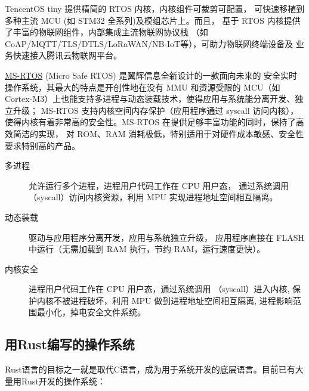 \documentclass{../runikraft-report}
\begin{document}
TencentOS tiny 提供精简的 RTOS 内核，内核组件可裁剪可配置，
可快速移植到多种主流 MCU (如 STM32 全系列)及模组芯片上。而且，
基于 RTOS 内核提供了丰富的物联网组件，内部集成主流物联网协议栈
（如CoAP/MQTT/TLS/DTLS/LoRaWAN/NB-IoT等），可助力物联网终端设备及
业务快速接入腾讯云物联网平台。

\href{https://github.com/ms-rtos}{MS-RTOS} (Micro Safe RTOS) 是翼辉信息全新设计的一款面向未来的
安全实时操作系统，其最大的特点是开创性地在没有 MMU 和资源受限的 MCU（如Cortex-M3）上也能支持多进程与动态装载技术，使得应用与系统能分离开发、独立升级；
MS-RTOS 支持内核空间内存保护（应用程序通过 syscall 访问内核），
使得内核有着非常高的安全性。MS-RTOS 在提供足够丰富功能的同时，保持了高效简洁的实现，
对 ROM、RAM 消耗极低，特别适用于对硬件成本敏感、安全性要求特别高的产品。\cite{bib:ms-rtos}

\begin{description}
\item[多进程] 允许运行多个进程，进程用户代码工作在 CPU 用户态，
通过系统调用（syscall）访问内核资源，利用 MPU 实现进程地址空间相互隔离。
\item[动态装载] 驱动与应用程序分离开发，应用与系统独立升级，
应用程序直接在 FLASH 中运行（无需加载到 RAM 执行，节约 RAM，运行速度更快）。
\item[内核安全] 进程用户代码工作在 CPU 用户态，通过系统调用
（syscall）进入内核, 保护内核不被进程破坏，利用 MPU 做到进程地址空间相互隔离,
进程影响范围最小化，掉电安全文件系统。
\end{description}
\subsection{用Rust编写的操作系统}
Rust语言的目标之一就是取代C语言，成为用于系统开发的底层语言。目前已有大量用Rust开发的操作系统：\cite{bib:rust-os-comparison}
\end{document}

